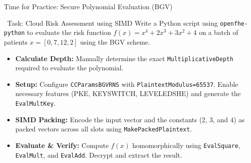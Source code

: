 \documentclass[aspectratio=169, 10pt]{beamer}
\begin{document}
\begin{frame}{Time for Practice: Secure Polynomial Evaluation (BGV)}
\begin{block}{\faKeyboard \ Task: Cloud Risk Assessment using SIMD}
\small
Write a Python script using \texttt{openfhe-python} to evaluate the risk function $f(x) = x^4 + 2x^3 + 3x^2 + 4$ on a batch of patients $x = [0, 7, 12, 2]$ using the BGV scheme.
\vspace{0.1cm}
\begin{itemize}
\setlength{\itemsep}{0.05cm}
\item[\textbf{1.}] \textbf{Calculate Depth:} Manually determine the exact \texttt{MultiplicativeDepth} required to evaluate the polynomial.
\item[\textbf{2.}] \textbf{Setup:} Configure \texttt{CCParamsBGVRNS} with \texttt{PlaintextModulus=65537}. Enable necessary features (PKE, KEYSWITCH, LEVELEDSHE) and generate the \texttt{EvalMultKey}.
\item[\textbf{3.}] \textbf{SIMD Packing:} Encode the input vector and the constants (2, 3, and 4) as packed vectors across all slots using \texttt{MakePackedPlaintext}.
\item[\textbf{4.}] \textbf{Evaluate \& Verify:} Compute $f(x)$ homomorphically using \texttt{EvalSquare}, \texttt{EvalMult}, and \texttt{EvalAdd}. Decrypt and extract the result.
\end{itemize}
\end{block}
\end{frame}
\end{document}
